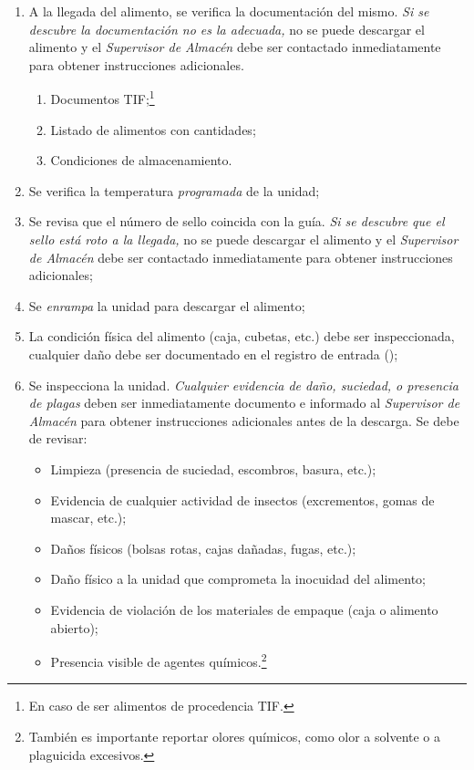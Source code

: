 \begin{enumerate}
	\item A la llegada del alimento, se verifica la documentación del mismo. \emph{Si se descubre la documentación no es la adecuada,} no se puede descargar el alimento y el \emph{Supervisor de Almacén} debe ser contactado inmediatamente para obtener instrucciones adicionales.
		\begin{enumerate}
			\item Documentos TIF;\footnote{En caso de ser alimentos de procedencia TIF.}
			\item Listado de alimentos con cantidades;
			\item Condiciones de almacenamiento.
		\end{enumerate}
	\item Se verifica la temperatura \emph{programada} de la unidad;
	\item Se revisa que el número de sello coincida con la guía. \emph{Si se descubre que el sello está roto a la llegada,} no se puede descargar el alimento y el \emph{Supervisor de Almacén} debe ser contactado inmediatamente para obtener instrucciones adicionales;
	\item Se \textit{enrampa} la unidad para descargar el alimento;
	\item La condición física del alimento (caja, cubetas, etc.) debe ser inspeccionada, cualquier daño debe ser documentado en el registro de entrada (\Oent);
	\item Se inspecciona la unidad. \emph{Cualquier evidencia de daño, suciedad, o presencia de plagas} deben ser inmediatamente documento e informado al \emph{Supervisor de Almacén} para obtener instrucciones adicionales antes de la descarga. Se debe de revisar:
		\begin{itemize}
			\item Limpieza (presencia de suciedad, escombros, basura, etc.);
			\item Evidencia de cualquier actividad de insectos (excrementos, gomas de mascar, etc.);
			\item Daños físicos (bolsas rotas, cajas dañadas, fugas, etc.);
			\item Daño físico a la unidad que comprometa la inocuidad del alimento;
			\item Evidencia de violación de los materiales de empaque (caja o alimento abierto);
			\item Presencia visible de agentes químicos.\footnote{También es importante reportar olores químicos, como olor a solvente o a plaguicida excesivos.}

\end{itemize}
\end{enumerate}
